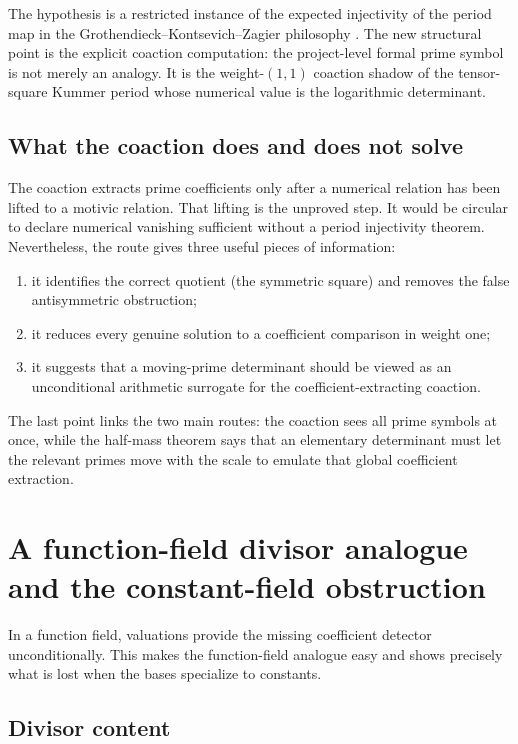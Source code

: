 \documentclass[11pt]{article}
\theoremstyle{definition}
\theoremstyle{remark}
\begin{document}
The hypothesis is a restricted instance of the expected injectivity of the
period map in the Grothendieck--Kontsevich--Zagier philosophy
\cite{KontsevichZagier2001}.  The new structural point is the explicit
coaction computation: the project-level formal prime symbol is not merely an
analogy.  It is the weight-$(1,1)$ coaction shadow of the tensor-square Kummer
period whose numerical value is the logarithmic determinant.

\subsection{What the coaction does and does not solve}

The coaction extracts prime coefficients only after a numerical relation has
been lifted to a motivic relation.  That lifting is the unproved step.  It
would be circular to declare numerical vanishing sufficient without a period
injectivity theorem.  Nevertheless, the route gives three useful pieces of
information:
\begin{enumerate}
 \item it identifies the correct quotient (the symmetric square) and removes
       the false antisymmetric obstruction;
 \item it reduces every genuine solution to a coefficient comparison in
       weight one;
 \item it suggests that a moving-prime determinant should be viewed as an
       unconditional arithmetic surrogate for the coefficient-extracting
       coaction.
\end{enumerate}
The last point links the two main routes: the coaction sees all prime symbols
at once, while the half-mass theorem says that an elementary determinant must
let the relevant primes move with the scale to emulate that global
coefficient extraction.

\section{A function-field divisor analogue and the constant-field obstruction}

In a function field, valuations provide the missing coefficient detector
unconditionally.  This makes the function-field analogue easy and shows
precisely what is lost when the bases specialize to constants.

\subsection{Divisor content}
\end{document}
